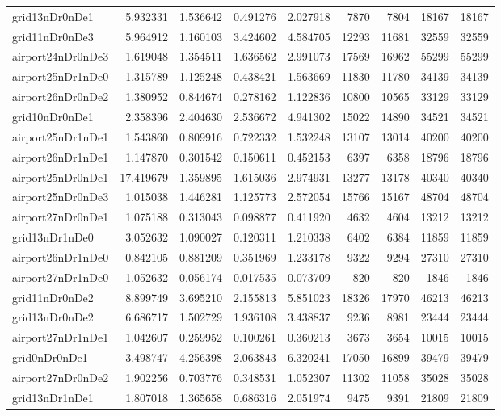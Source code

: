 \begin{longtable}{|l|r|r|r|r|r|r|r|r|}
grid13nDr0nDe1 & 5.932331 & 1.536642 & 0.491276 & 2.027918 & 7870 & 7804 & 18167 & 18167 \\
grid11nDr0nDe3 & 5.964912 & 1.160103 & 3.424602 & 4.584705 & 12293 & 11681 & 32559 & 32559 \\
airport24nDr0nDe3 & 1.619048 & 1.354511 & 1.636562 & 2.991073 & 17569 & 16962 & 55299 & 55299 \\
airport25nDr1nDe0 & 1.315789 & 1.125248 & 0.438421 & 1.563669 & 11830 & 11780 & 34139 & 34139 \\
airport26nDr0nDe2 & 1.380952 & 0.844674 & 0.278162 & 1.122836 & 10800 & 10565 & 33129 & 33129 \\
grid10nDr0nDe1 & 2.358396 & 2.404630 & 2.536672 & 4.941302 & 15022 & 14890 & 34521 & 34521 \\
airport25nDr1nDe1 & 1.543860 & 0.809916 & 0.722332 & 1.532248 & 13107 & 13014 & 40200 & 40200 \\
airport26nDr1nDe1 & 1.147870 & 0.301542 & 0.150611 & 0.452153 & 6397 & 6358 & 18796 & 18796 \\
airport25nDr0nDe1 & 17.419679 & 1.359895 & 1.615036 & 2.974931 & 13277 & 13178 & 40340 & 40340 \\
airport25nDr0nDe3 & 1.015038 & 1.446281 & 1.125773 & 2.572054 & 15766 & 15167 & 48704 & 48704 \\
airport27nDr0nDe1 & 1.075188 & 0.313043 & 0.098877 & 0.411920 & 4632 & 4604 & 13212 & 13212 \\
grid13nDr1nDe0 & 3.052632 & 1.090027 & 0.120311 & 1.210338 & 6402 & 6384 & 11859 & 11859 \\
airport26nDr1nDe0 & 0.842105 & 0.881209 & 0.351969 & 1.233178 & 9322 & 9294 & 27310 & 27310 \\
airport27nDr1nDe0 & 1.052632 & 0.056174 & 0.017535 & 0.073709 & 820 & 820 & 1846 & 1846 \\
grid11nDr0nDe2 & 8.899749 & 3.695210 & 2.155813 & 5.851023 & 18326 & 17970 & 46213 & 46213 \\
grid13nDr0nDe2 & 6.686717 & 1.502729 & 1.936108 & 3.438837 & 9236 & 8981 & 23444 & 23444 \\
airport27nDr1nDe1 & 1.042607 & 0.259952 & 0.100261 & 0.360213 & 3673 & 3654 & 10015 & 10015 \\
grid0nDr0nDe1 & 3.498747 & 4.256398 & 2.063843 & 6.320241 & 17050 & 16899 & 39479 & 39479 \\
airport27nDr0nDe2 & 1.902256 & 0.703776 & 0.348531 & 1.052307 & 11302 & 11058 & 35028 & 35028 \\
grid13nDr1nDe1 & 1.807018 & 1.365658 & 0.686316 & 2.051974 & 9475 & 9391 & 21809 & 21809 \\

\end{longtable}
